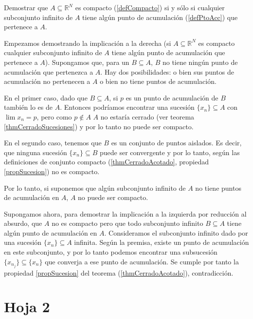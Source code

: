 \begin{problem}[7] Demostrar que $A⊆ℝ^N$ es compacto (\ref{defCompacto}) si y sólo si cualquier subconjunto infinito de $A$ tiene algún punto de acumulación (\ref{defPtoAcc}) que pertenece a $A$.

\solution

Empezamos demostrando la implicación a la derecha (si $A⊆ℝ^N$ es compacto cualquier subconjunto infinito de $A$ tiene algún punto de acumulación que pertenece a $A$). Supongamos que, para un $B⊆A$, $B$ no tiene ningún punto de acumulación que pertenezca a $A$. Hay dos posibilidades: o bien sus puntos de acumulación no pertenecen a $A$ o bien no tiene puntos de acumulación.

En el primer caso, dado que $B⊆A$, si $p$ es un punto de acumulación de $B$ también lo es de $A$. Entonces podríamos encontrar una sucesión $\{x_n\} ⊆ A$ con $\lim x_n = p$, pero como $p\notin A$ $A$ no estaría cerrado (ver teorema \ref{thmCerradoSucesiones}) y por lo tanto no puede ser compacto.

En el segundo caso, tenemos que $B$ es un conjunto de puntos aislados. Es decir, que ninguna sucesión $\{x_n\} ⊆ B$ puede ser convergente y por lo tanto, según las definiciones de conjunto compacto (\ref{thmCerradoAcotado}, propiedad \ref{propSucesion}) no es compacto.

Por lo tanto, si suponemos que algún subconjunto infinito de $A$ no tiene puntos de acumulación en $A$, $A$ no puede ser compacto.

Supongamos ahora, para demostrar la implicación a la izquierda por reducción al absurdo, que $A$ no es compacto pero que todo subconjunto infinito $B⊆A$ tiene algún punto de acumulación en $A$. Consideramos el subconjunto infinito dado por una sucesión $\{x_n\} ⊆ A$ infinita. Según la premisa, existe un punto de acumulación en este subconjunto, y por lo tanto podemos encontrar una subsucesión $\{x_{n_j}\}⊆\{x_n\}$ que converja a ese punto de acumulación. Se cumple por tanto la propiedad \ref{propSucesion} del teorema (\ref{thmCerradoAcotado}), contradicción.


\end{problem}

\section{Hoja 2}

